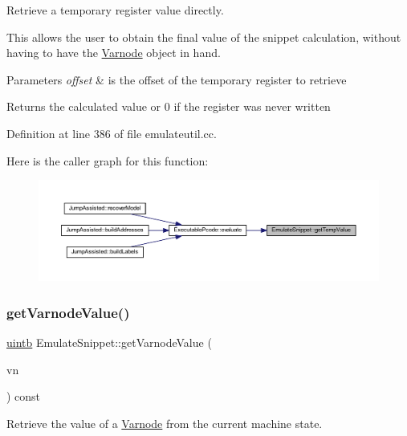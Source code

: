 Retrieve a temporary register value directly. 

This allows the user to obtain the final value of the snippet calculation, without having to have the \mbox{\hyperlink{class_varnode}{Varnode}} object in hand. 
\begin{DoxyParams}{Parameters}
{\em offset} & is the offset of the temporary register to retrieve \\
\hline
\end{DoxyParams}
\begin{DoxyReturn}{Returns}
the calculated value or 0 if the register was never written 
\end{DoxyReturn}


Definition at line 386 of file emulateutil.\+cc.

Here is the caller graph for this function\+:
\nopagebreak
\begin{figure}[H]
\begin{center}
\leavevmode
\includegraphics[width=350pt]{class_emulate_snippet_a77a5c0e4b9085b84e2d487568f9aa484_icgraph}
\end{center}
\end{figure}
\mbox{\label{class_emulate_snippet_af19946de88e6ea7dbf396648640fdb97}} 
\subsubsection{\texorpdfstring{getVarnodeValue()}{getVarnodeValue()}}
{\footnotesize\ttfamily \mbox{\hyperlink{types_8h_a2db313c5d32a12b01d26ac9b3bca178f}{uintb}} Emulate\+Snippet\+::get\+Varnode\+Value (\begin{DoxyParamCaption}\item[{\mbox{\hyperlink{struct_varnode_data}{Varnode\+Data}} $\ast$}]{vn }\end{DoxyParamCaption}) const}



Retrieve the value of a \mbox{\hyperlink{class_varnode}{Varnode}} from the current machine state. 


